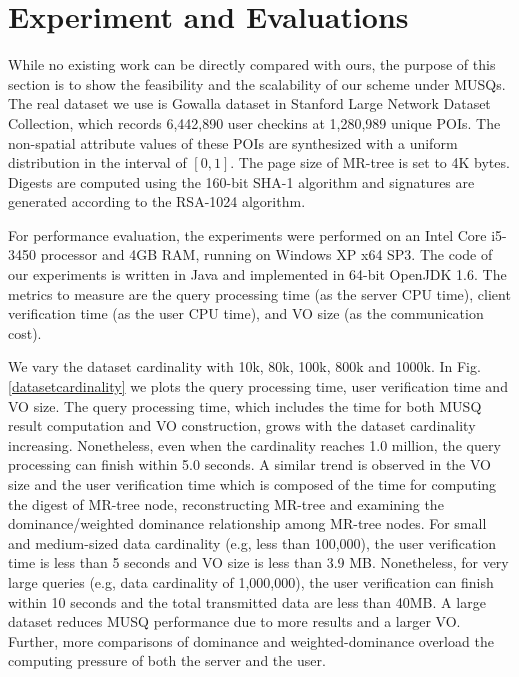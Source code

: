 \documentclass[10pt, conference, compsocconf]{IEEEtran}
\begin{document}
\section{Experiment and Evaluations}\label{evaluation}

While no existing work can be directly compared with ours, the purpose of this section is to show the feasibility and the scalability of our scheme under MUSQs. The real dataset we use is Gowalla \cite{} dataset in Stanford Large Network Dataset Collection, which records 6,442,890 user checkins at 1,280,989 unique POIs. The non-spatial attribute values of these POIs are synthesized with a uniform distribution in the interval of $[0,1]$. The page size of MR-tree is set to 4K bytes. Digests are computed using the 160-bit SHA-1 algorithm and signatures are generated according to the RSA-1024 algorithm. %

For performance evaluation, the experiments were performed on an Intel Core i5-3450 processor and 4GB RAM, running on Windows XP x64 SP3. The code of our experiments is written in Java and implemented in 64-bit OpenJDK 1.6. The metrics to measure are the query processing time (as the server CPU time), client verification time (as the user CPU time), and VO size (as the communication cost). 

We vary the dataset cardinality with 10k, 80k, 100k, 800k and 1000k. In Fig. \ref{datasetcardinality} we plots the query processing time, user verification time and VO size. The query processing time, which includes the time for both MUSQ result computation and VO construction, grows with the dataset cardinality increasing. Nonetheless, even when the cardinality reaches 1.0 million, the query processing can finish within 5.0 seconds. A similar trend is observed in the VO size and the user verification time which is composed of the time for computing the digest of MR-tree node, reconstructing MR-tree and examining the dominance/weighted dominance relationship among MR-tree nodes. For small and medium-sized data cardinality (e.g, less than 100,000), the user verification time is less than 5 seconds and VO size is less than 3.9 MB. Nonetheless, for very large queries (e.g, data cardinality of 1,000,000), the user verification can finish within 10 seconds and the total transmitted data are less than 40MB. A large dataset reduces MUSQ performance due to more results and a larger VO. Further, more comparisons of dominance and weighted-dominance overload the computing pressure of both the server and the user.
\end{document}
